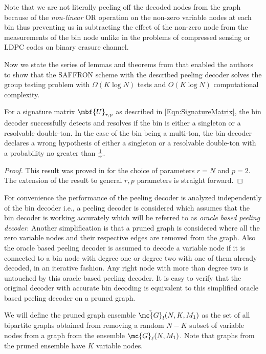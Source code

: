 \documentclass[conference,,twocolumn]{IEEEtran}
\begin{document}
\begin{Remark}
 Note that we are not literally peeling off the decoded nodes from the graph because of the \textit{non-linear} OR operation on the non-zero variable nodes at each bin thus preventing us in subtracting the effect of the non-zero node from the measurements of the bin node unlike in the problems of compressed sensing or LDPC codes on binary erasure channel.
\end{Remark}

Now we state the series of lemmas and theorems from \cite{lee2015saffron} that enabled the authors to show that the SAFFRON scheme with the described peeling decoder solves the group testing problem with $\Omega( K\log N)$ tests and $O(K\log N)$ computational complexity.

\begin{lemma}
\label{Lem:BinDecoderAnalysis}
For a signature matrix $\mbf{U}_{r,p}$ as described in \eqref{Eqn:SignatureMatrix}, the bin decoder successfully detects and resolves if the bin is either a singleton or a resolvable double-ton. In the case of the bin being a multi-ton, the bin decoder declares a wrong hypothesis of either a singleton or a resolvable double-ton with a probability no greater than $\frac{1}{r^p}$.
\end{lemma}
\begin{proof}
This result was proved in \cite{lee2015saffron} for the choice of parameters $r=N$ and $p=2$. The extension of the result to general $r,p$ parameters is straight forward.
\end{proof}

For convenience the performance of the peeling decoder is analyzed independently of the bin decoder i.e., a peeling decoder is considered which assumes that the bin decoder is working accurately which will be referred to as \textit{oracle based peeling decoder}. Another simplification is that a pruned graph is considered where all the zero variable nodes and their respective edges are removed from the graph. Also the oracle based peeling decoder is assumed to decode a variable node if it is connected to a bin node with degree one or degree two with one of them already decoded, in an iterative fashion. Any right node with more than degree two is untouched by this oracle based peeling decoder. It is easy to verify that the original decoder with accurate bin decoding is equivalent to this simplified oracle based peeling decoder on a pruned graph.
\begin{definition}
We will define the pruned graph ensemble $\tilde{\mc{G}}_l(N,K,M_1)$ as the set of all bipartite graphs obtained from removing a random $N-K$ subset of variable nodes from a graph from the ensemble $\mc{G}_{\ell}(N,M_1)$. Note that graphs from the pruned ensemble have $K$ variable nodes. 
\end{definition}	
\end{document}
